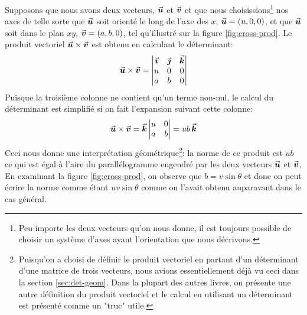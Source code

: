 Supposons que nous avons deux vecteurs, $\vec{\boldsymbol{u}}$ et $\vec{\boldsymbol{v}}$ et que nous
choisissions\footnote{Peu importe les deux vecteurs qu'on nous donne,
il est toujours possible de choisir un système d'axes ayant l'orientation
que nous décrivons.} nos axes de telle sorte que $\vec{\boldsymbol{u}}$ soit orienté le long de l'axe
des $x$, $\vec{\boldsymbol{u}} = (u, 0, 0)$, et que $\vec{\boldsymbol{u}}$ soit dans le plan $xy$, 
$\vec{\boldsymbol{v}} = (a, b, 0)$, tel qu'illustré sur la figure \ref{fig:cross-prod}.
Le produit vectoriel $\vec{\boldsymbol{u}}\times\vec{\boldsymbol{v}}$ est obtenu en
calculant le déterminant:
\[
\vec{\boldsymbol{u}}\times\vec{\boldsymbol{v}} = 
\begin{vmatrix}
\vec{\boldsymbol{\imath}} & \vec{\boldsymbol{\jmath}} & \vec{\boldsymbol{k}}\\
u & 0 & 0 \\
a & b & 0 
\end{vmatrix}
\]
Puisque la troisième colonne ne contient qu'un terme non-nul, le calcul
du déterminant est simplifié si on fait l'expansion suivant cette colonne:
\[
\vec{\boldsymbol{u}}\times\vec{\boldsymbol{v}} = \vec{\boldsymbol{k}}
\begin{vmatrix}
u & 0 \\
a & b
\end{vmatrix} = ub\, \vec{\boldsymbol{k}}
\]
Ceci nous donne une interprétation géométrique\footnote{Puisqu'on a choisi de définir le produit
vectoriel en partant d'un déterminant d'une matrice de trois vecteurs, 
nous avions essentiellement déjà vu ceci dans la section \ref{sec:det-geom}.
Dans la plupart des autres livres, on présente une autre définition du produit vectoriel
et le calcul en utilisant un déterminant est présenté comme un "truc" utile.}: 
la norme de ce produit est $ub$ ce qui est égal à l'aire du parallélogramme engendré par les 
deux vecteurs $\vec{\boldsymbol{u}}$ et $\vec{\boldsymbol{v}}$. 
En examinant la figure  \ref{fig:cross-prod}, on observe que
$b=v\sin\theta$ et donc on peut écrire la norme comme étant $uv\sin\theta$ comme
on l'avait obtenu auparavant dans le cas général.
